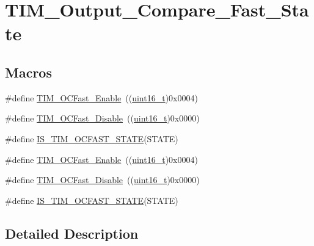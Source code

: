 \hypertarget{group___t_i_m___output___compare___fast___state}{}\section{T\+I\+M\+\_\+\+Output\+\_\+\+Compare\+\_\+\+Fast\+\_\+\+State}
\label{group___t_i_m___output___compare___fast___state}
\subsection*{Macros}
\begin{DoxyCompactItemize}
\item 
\#define \hyperlink{group___t_i_m___output___compare___fast___state_ga0cfb598c985363ee7004e52c97c524a3}{T\+I\+M\+\_\+\+O\+C\+Fast\+\_\+\+Enable}~((\hyperlink{_p_e___types_8h_a1f1825b69244eb3ad2c7165ddc99c956}{uint16\+\_\+t})0x0004)
\item 
\#define \hyperlink{group___t_i_m___output___compare___fast___state_gab3d39f8797953cb58754205169d8278e}{T\+I\+M\+\_\+\+O\+C\+Fast\+\_\+\+Disable}~((\hyperlink{_p_e___types_8h_a1f1825b69244eb3ad2c7165ddc99c956}{uint16\+\_\+t})0x0000)
\item 
\#define \hyperlink{group___t_i_m___output___compare___fast___state_ga65ad85cb4ba48660e8f519a1f6c298d2}{I\+S\+\_\+\+T\+I\+M\+\_\+\+O\+C\+F\+A\+S\+T\+\_\+\+S\+T\+A\+TE}(S\+T\+A\+TE)
\item 
\#define \hyperlink{group___t_i_m___output___compare___fast___state_ga0cfb598c985363ee7004e52c97c524a3}{T\+I\+M\+\_\+\+O\+C\+Fast\+\_\+\+Enable}~((\hyperlink{_p_e___types_8h_a1f1825b69244eb3ad2c7165ddc99c956}{uint16\+\_\+t})0x0004)
\item 
\#define \hyperlink{group___t_i_m___output___compare___fast___state_gab3d39f8797953cb58754205169d8278e}{T\+I\+M\+\_\+\+O\+C\+Fast\+\_\+\+Disable}~((\hyperlink{_p_e___types_8h_a1f1825b69244eb3ad2c7165ddc99c956}{uint16\+\_\+t})0x0000)
\item 
\#define \hyperlink{group___t_i_m___output___compare___fast___state_ga65ad85cb4ba48660e8f519a1f6c298d2}{I\+S\+\_\+\+T\+I\+M\+\_\+\+O\+C\+F\+A\+S\+T\+\_\+\+S\+T\+A\+TE}(S\+T\+A\+TE)
\end{DoxyCompactItemize}


\subsection{Detailed Description}


